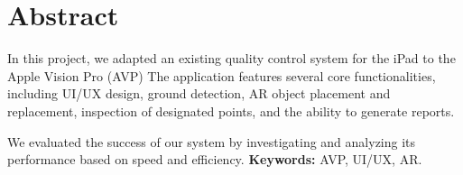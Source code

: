 \chapter*{Abstract}

In this project, we adapted an existing quality control system for the iPad to the Apple Vision Pro (AVP) The application features several core functionalities, including UI/UX design, ground detection, AR object placement and replacement, inspection of designated points, and the ability to generate reports.

We evaluated the success of our system by investigating and analyzing its performance based on speed and efficiency.
\vfill
\textbf{Keywords:} AVP, UI/UX, AR.
\clearpage